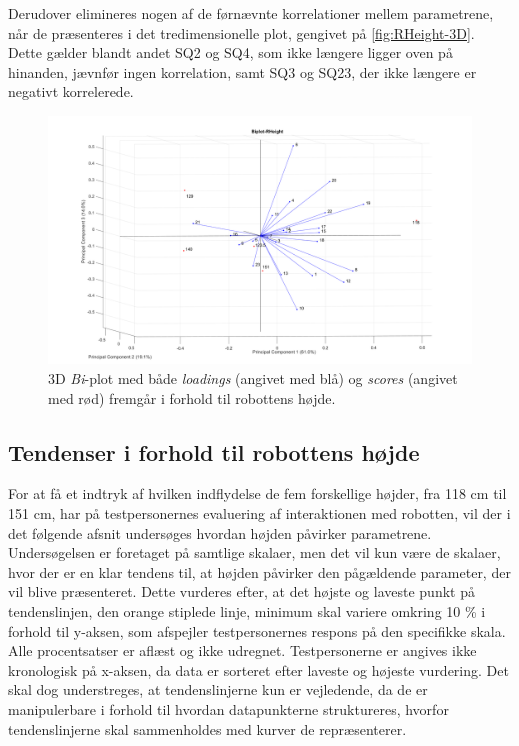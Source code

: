 Derudover elimineres nogen af de førnævnte korrelationer mellem parametrene, når de præsenteres i det tredimensionelle plot, gengivet på \autoref{fig:RHeight-3D}. Dette gælder blandt andet SQ2 og SQ4, som ikke længere ligger oven på hinanden, jævnfør ingen korrelation, samt SQ3 og SQ23, der ikke længere er negativt korrelerede.   
\begin{figure}[H]
\centering
\includegraphics[width=\textwidth]{Figure/DatabehandlingSkalaer/PCAfigures/RHeight-3D.png}
\caption{3D \textit{Bi}-plot med både \textit{loadings} (angivet med blå) og \textit{scores} (angivet med rød) fremgår i forhold til robottens højde.}
\label{fig:RHeight-3D}
\end{figure}
%

\subsection{Tendenser i forhold til robottens højde}
\label{DatabehandlingRHeightTendenser}
%
For at få et indtryk af hvilken indflydelse de fem forskellige højder, fra 118 cm til 151 cm, har på testpersonernes evaluering af interaktionen med robotten, vil der i det følgende afsnit undersøges hvordan højden påvirker parametrene. Undersøgelsen er foretaget på samtlige skalaer, men det vil kun være de skalaer, hvor der er en klar tendens til, at højden påvirker den pågældende parameter, der vil blive præsenteret. Dette vurderes efter, at det højste og laveste punkt på tendenslinjen, den orange stiplede linje, minimum skal variere omkring 10 \% i forhold til y-aksen, som afspejler testpersonernes respons på den specifikke skala. Alle procentsatser er aflæst og ikke udregnet. Testpersonerne er angives ikke kronologisk på x-aksen, da data er sorteret efter laveste og højeste vurdering. Det skal dog understreges, at tendenslinjerne kun er vejledende, da de er manipulerbare i forhold til hvordan datapunkterne struktureres, hvorfor tendenslinjerne skal sammenholdes med kurver de repræsenterer. 

